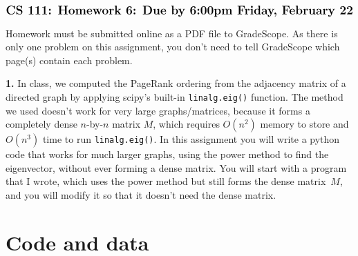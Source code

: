 \documentclass[11pt]{article}
\begin{document}
$$\mbox{\Large \bf CS 111: Homework 6: Due by 6:00pm Friday, February 22}$$
\par\bigskip\noindent
Homework must be submitted online as a PDF file to GradeScope.
As there is only one problem on this assignment, you don't
need to tell GradeScope which page(s) contain each problem. 

\par\bigskip
{\bf 1.}
In class, we computed the PageRank ordering from the adjacency matrix
of a directed graph by applying scipy's built-in {\tt linalg.eig()} function.  
The method we used doesn't work for very large graphs/matrices, because
it forms a completely dense $n$-by-$n$ matrix $M$, which requires $O(n^2)$ 
memory to store and $O(n^3)$ time to run {\tt linalg.eig()}.
In this assignment you will write a python code that works for much
larger graphs, using the power method to find the eigenvector, without
ever forming a dense matrix.
You will start with a program that I wrote, which uses the
power method but still forms the dense matrix~$M$, and you will
modify it so that it doesn't need the dense matrix.

\section{Code and data}
\end{document}
